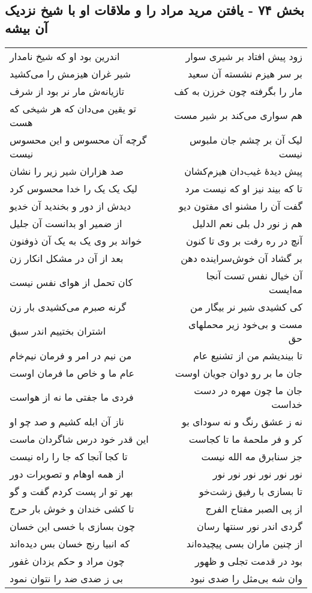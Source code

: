 \begin{center}
\section*{بخش ۷۴ - یافتن مرید مراد را و ملاقات او با شیخ نزدیک آن بیشه}
\label{sec:sh074}
\begin{longtable}{l p{0.5cm} r}
اندرین بود او که شیخ نامدار
&&
زود پیش افتاد بر شیری سوار
\\
شیر غران هیزمش را می‌کشید
&&
بر سر هیزم نشسته آن سعید
\\
تازیانه‌ش مار نر بود از شرف
&&
مار را بگرفته چون خرزن به کف
\\
تو یقین می‌دان که هر شیخی که هست
&&
هم سواری می‌کند بر شیر مست
\\
گرچه آن محسوس و این محسوس نیست
&&
لیک آن بر چشم جان ملبوس نیست
\\
صد هزاران شیر زیر را نشان
&&
پیش دیدهٔ غیب‌دان هیزم‌کشان
\\
لیک یک یک را خدا محسوس کرد
&&
تا که بیند نیز او که نیست مرد
\\
دیدش از دور و بخندید آن خدیو
&&
گفت آن را مشنو ای مفتون دیو
\\
از ضمیر او بدانست آن جلیل
&&
هم ز نور دل بلی نعم الدلیل
\\
خواند بر وی یک به یک آن ذوفنون
&&
آنچ در ره رفت بر وی تا کنون
\\
بعد از آن در مشکل انکار زن
&&
بر گشاد آن خوش‌سراینده دهن
\\
کان تحمل از هوای نفس نیست
&&
آن خیال نفس تست آنجا مه‌ایست
\\
گرنه صبرم می‌کشیدی بار زن
&&
کی کشیدی شیر نر بیگار من
\\
اشتران بختییم اندر سبق
&&
مست و بی‌خود زیر محملهای حق
\\
من نیم در امر و فرمان نیم‌خام
&&
تا بیندیشم من از تشنیع عام
\\
عام ما و خاص ما فرمان اوست
&&
جان ما بر رو دوان جویان اوست
\\
فردی ما جفتی ما نه از هواست
&&
جان ما چون مهره در دست خداست
\\
ناز آن ابله کشیم و صد چو او
&&
نه ز عشق رنگ و نه سودای بو
\\
این قدر خود درس شاگردان ماست
&&
کر و فر ملحمهٔ ما تا کجاست
\\
تا کجا آنجا که جا را راه نیست
&&
جز سنابرق مه الله نیست
\\
از همه اوهام و تصویرات دور
&&
نور نور نور نور نور نور
\\
بهر تو ار پست کردم گفت و گو
&&
تا بسازی با رفیق زشت‌خو
\\
تا کشی خندان و خوش بار حرج
&&
از پی الصبر مفتاح الفرج
\\
چون بسازی با خسی این خسان
&&
گردی اندر نور سنتها رسان
\\
که انبیا رنج خسان بس دیده‌اند
&&
از چنین ماران بسی پیچیده‌اند
\\
چون مراد و حکم یزدان غفور
&&
بود در قدمت تجلی و ظهور
\\
بی ز ضدی ضد را نتوان نمود
&&
وان شه بی‌مثل را ضدی نبود
\\
\end{longtable}
\end{center}
